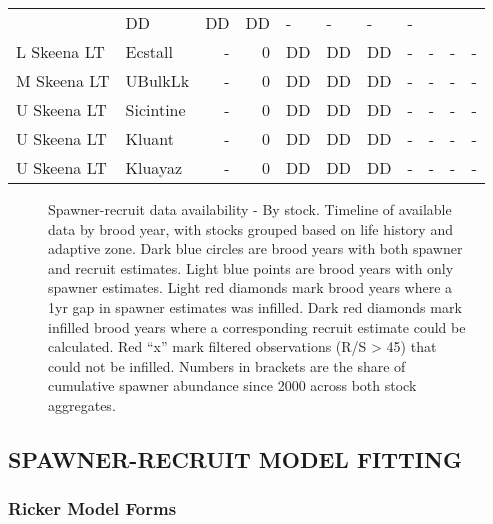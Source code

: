 \documentclass[french,11pt]{book}
\begin{document}
\begin{longtable}[t]{llrrlllrrrr}
& DD & DD & DD & - & - & - & -\\ L Skeena LT & Ecstall & - & 0 & DD & DD & DD & - & - & - & -\\ M Skeena LT & UBulkLk & - & 0 & DD & DD & DD & - & - & - & -\\ U Skeena LT & Sicintine & - & 0 & DD & DD & DD & - & - & - & -\\ U Skeena LT & Kluant & - & 0 & DD & DD & DD & - & - & - & -\\ U Skeena LT & Kluayaz & - & 0 & DD & DD & DD & - & - & - & -\\* \end{longtable}

\endgroup{} \endgroup{}

\clearpage


\begin{figure}[htb]

{\centering {} 

}

\caption{Spawner-recruit data availability - By stock. Timeline of available data by brood year, with stocks grouped based on life history and adaptive zone. Dark blue circles are brood years with both spawner and recruit estimates. Light blue points are brood years with only spawner estimates. Light red diamonds mark brood years where a 1yr gap in spawner estimates was infilled. Dark red diamonds mark infilled brood years where a corresponding recruit estimate could be calculated. Red ``x'' mark filtered observations (R/S \textgreater{} 45) that could not be infilled. Numbers in brackets are the share of cumulative spawner abundance since 2000 across both stock aggregates.}\label{fig:SRDataOverview}
\end{figure}
\clearpage

\subsection{SPAWNER-RECRUIT MODEL FITTING}\label{SRFitting}

\subsubsection{Ricker Model Forms}\label{ModelForms}
\end{document}
